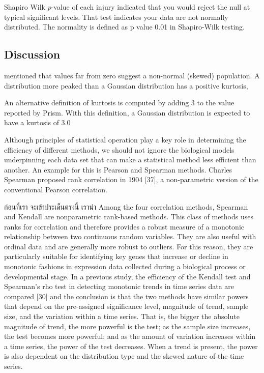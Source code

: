 Shapiro Wilk $p$-value of each injury indicated that you would reject the null at typical significant levels. That test indicates your data are not normally distributed. The normality is defined as p value 0.01 in Shapiro-Wilk testing.


\subsection{Discussion}


\citet{Doane_2011_Measuring} mentioned that values far from zero suggest a non-normal (skewed) population.
A distribution more peaked than a Gaussian distribution has a positive kurtosis, 

An alternative definition of kurtosis is computed by adding 3 to the value reported by Prism. With this definition, a Gaussian distribution is expected to have a kurtosis of 3.0

Although principles of statistical operation play a key role in determining the efficiency of different methods, we should not ignore the biological models underpinning each data set that can make a statistical method less efficient than another. An example for this is Pearson and Spearman methods. Charles Spearman proposed rank correlation in 1904 [37], a non-parametric version of the conventional Pearson correlation. 

ก่อนที่เรา จะเข้าประเด็นตรงนี้ เราน่า
Among the four correlation methods, Spearman and Kendall are nonparametric rank-based methods. This class of methods uses ranks for correlation and therefore provides a robust measure of a monotonic relationship between two continuous random variables. They are also useful with ordinal data and are generally more robust to outliers. For this reason, they are particularly suitable for identifying key genes that increase or decline in monotonic fashions in expression data collected during a biological process or developmental stage. In a previous study, the efficiency of the Kendall test and Spearman’s rho test in detecting monotonic trends in time series data are compared [30] and the conclusion is that the two methods have similar powers that depend on the pre-assigned significance level, magnitude of trend, sample size, and the variation within a time series. That is, the bigger the absolute magnitude of trend, the more powerful is the test; as the sample size increases, the test becomes more powerful; and as the amount of variation increases within a time series, the power of the test decreases. When a trend is present, the power is also dependent on the distribution type and the skewed nature of the time series. 


